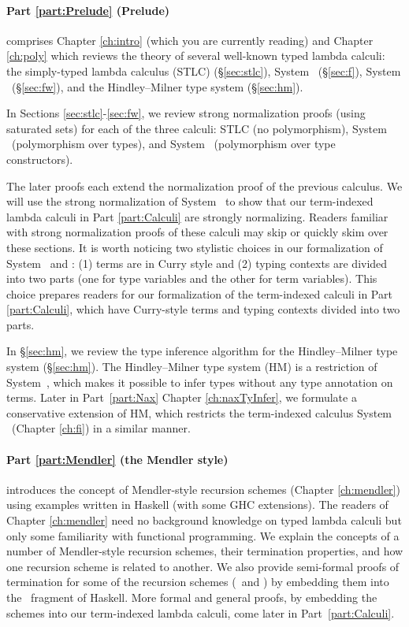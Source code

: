 \paragraph{Part \ref{part:Prelude} (Prelude)}\hspace{-1em} 
comprises Chapter \ref{ch:intro} (which you are currently reading)
and Chapter \ref{ch:poly} which 
reviews the theory of several well-known typed lambda calculi:
the simply-typed lambda calculus (STLC) (\S\ref{sec:stlc}),
System \F\ (\S\ref{sec:f}),
System \Fw\ (\S\ref{sec:fw}), and
the Hindley--Milner type system (\S\ref{sec:hm}).

In Sections \ref{sec:stlc}-\ref{sec:fw}, we review strong normalization proofs
(using saturated sets) for each of the three calculi:
STLC (no polymorphism), System \F\ (polymorphism over types), and
System \Fw\ (polymorphism over type constructors).

The later proofs each extend the normalization proof of the previous calculus.
We will use the strong normalization of System \Fw\ to show that
our term-indexed lambda calculi in Part \ref{part:Calculi} are
strongly normalizing. Readers familiar with strong normalization proofs
of these calculi may skip or quickly skim over these sections.
It is worth noticing two stylistic choices in our formalization of
System \F\ and \Fw: (1) terms are in Curry style and
(2) typing contexts are divided into two parts
    (one for type variables and the other for term variables).
This choice prepares readers for our formalization of the term-indexed calculi
in Part \ref{part:Calculi}, which have Curry-style terms and
typing contexts divided into two parts.

In \S\ref{sec:hm}, we review the type inference algorithm for
the Hindley--Milner type system (\S\ref{sec:hm}).
The Hindley--Milner type system (HM) is a restriction of System~\F,
which makes it possible to infer types without any type annotation on terms.
Later in Part~\ref{part:Nax} Chapter \ref{ch:naxTyInfer},
we formulate a conservative extension of HM, which restricts
the term-indexed calculus System \Fi\ (Chapter \ref{ch:fi}) in a similar manner.

\paragraph{Part \ref{part:Mendler} (the Mendler style)}\hspace{-1em} introduces
the concept of Mendler-style recursion schemes (Chapter \ref{ch:mendler})
using examples written in Haskell (with some GHC extensions). The readers
of Chapter \ref{ch:mendler} need no background knowledge
on typed lambda calculi but only some familiarity with functional programming.
We explain the concepts of a number of Mendler-style recursion schemes,
their termination properties, and how one recursion scheme is related to
another. We also provide semi-formal proofs of termination for some of
the recursion schemes (\MIt\ and \MsfIt) by embedding them into
the \Fw\ fragment of Haskell. More formal and general proofs,
by embedding the schemes into our term-indexed lambda calculi,
come later in Part~\ref{part:Calculi}.


